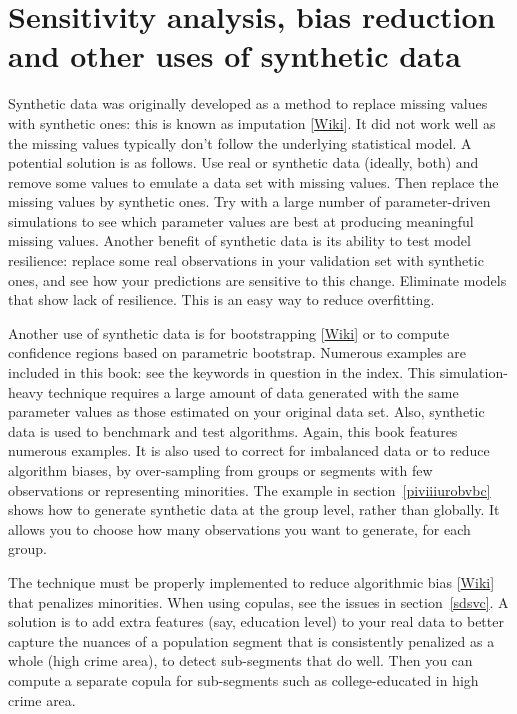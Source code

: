 \documentclass[oneside,10pt]{book}
\begin{document}
\section{Sensitivity analysis, bias reduction and other uses of synthetic data}

\textcolor{index}{Synthetic data} was originally developed as a method to replace missing values with synthetic ones: this is known
as \textcolor{index}{imputation} [\href{https://en.wikipedia.org/wiki/Imputation_(statistics)}{Wiki}].
It did not work well as the missing values typically don't follow the underlying statistical model. A potential solution is as follows.
Use real or synthetic data (ideally, both) and remove some values to emulate a data set with missing values. Then replace the missing values by synthetic ones. Try with a large number of parameter-driven simulations to see which parameter values are best at producing meaningful missing values. Another benefit of synthetic data is its ability to test model resilience: replace some real observations in your
\textcolor{index}{validation set} with
 synthetic ones, and see how your predictions are sensitive to this change. Eliminate models that show lack of resilience. This is an easy way to reduce \textcolor{index}{overfitting}.

Another use of synthetic data is for \textcolor{index}{bootstrapping} [\href{https://en.wikipedia.org/wiki/Bootstrapping_(statistics)}{Wiki}] or to compute \textcolor{index}{confidence regions} based on
\textcolor{index}{parametric bootstrap}. Numerous examples are included in this book: see the keywords in question in the index. This simulation-heavy technique requires a large amount of
 data generated with the same parameter values as those estimated on your original data set. Also, synthetic data is used to benchmark and test
 algorithms. Again, this book features numerous examples. It is also used to correct for imbalanced data or to reduce algorithm biases, by over-sampling from groups or segments with few observations or representing minorities. The example in section~\ref{piviiiurobvbc} shows
 how to generate synthetic data at the group level, rather than globally. It allows you to choose how many observations you want to generate, for each group.

The technique must be properly implemented to reduce \textcolor{index}{algorithmic bias} [\href{https://en.wikipedia.org/wiki/Algorithmic_bias}{Wiki}] that penalizes minorities. When using copulas, see the issues in section~\ref{sdsvc}. A solution  is to add extra features (say, education level) to your real data to better capture the nuances of a population segment that is consistently penalized as a whole (high crime area), to detect sub-segments that do well. Then you can compute a separate copula for sub-segments such as college-educated in high crime area.
\end{document}
